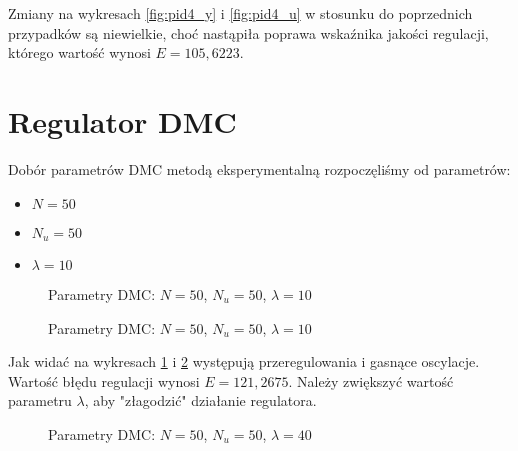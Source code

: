 Zmiany na wykresach \ref{fig:pid4_y} i \ref{fig:pid4_u} w stosunku do poprzednich przypadków są niewielkie, choć nastąpiła poprawa wskaźnika jakości regulacji, którego wartość wynosi $E=105,6223$.

\section{Regulator DMC}
Dobór parametrów DMC metodą eksperymentalną rozpoczęliśmy od parametrów:
\begin{itemize}
\item $N=50$
\item $N_u=50$
\item $\lambda=10$
\end{itemize}

\begin{figure}[H]
\centering
{}
\caption{Parametry DMC: $N=50$, $N_u=50$, $\lambda=10$}
\label{fig:dmc1_y}
\end{figure}

\begin{figure}[H]
\centering
{}
\caption{Parametry DMC: $N=50$, $N_u=50$, $\lambda=10$}
\label{fig:dmc1_u}
\end{figure}

Jak widać na wykresach \ref{fig:dmc1_y} i \ref{fig:dmc1_u} występują przeregulowania i gasnące oscylacje. Wartość błędu regulacji wynosi $E=121,2675$. Należy zwiększyć wartość parametru $\lambda$, aby "złagodzić" działanie regulatora.

\begin{figure}[H]
\centering
{}
\caption{Parametry DMC: $N=50$, $N_u=50$, $\lambda=40$}
\label{fig:dmc2_y}
\end{figure}

